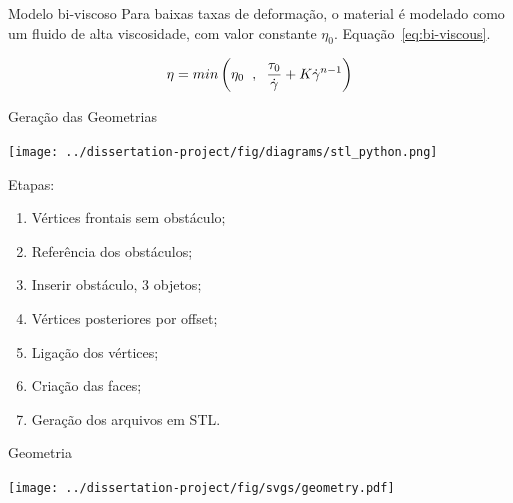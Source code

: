 \begin{frame}{Modelo bi-viscoso}
    Para baixas taxas de deformação, o material é modelado como um fluido de alta viscosidade, com valor constante $\eta_0$. Equação~\ref{eq:bi-viscous}.

    \begin{equation} \label{eq:bi-viscous}
        \eta = min \left( \eta_0 \hspace{0.2cm} , \hspace{0.2cm} \frac{\tau_0}{\dot{\gamma}} + K\dot{\gamma}^{n-1}  \right)
    \end{equation}

\end{frame}

\begin{frame}{Geração das Geometrias}
    \begin{minipage}[c]{0.55\textwidth}
        \centering
        \texttt{[image: ../dissertation-project/fig/diagrams/stl\_python.png]}
    \end{minipage}
    \hfill
    \begin{minipage}[c]{0.43\textwidth}
        Etapas:
        \vspace{.25cm}
        \begin{enumerate}
            \item Vértices frontais sem obstáculo; \pause
            \item Referência dos obstáculos; \pause
            \item Inserir obstáculo, 3 objetos; \pause
            \item Vértices posteriores por offset; \pause
            \item Ligação dos vértices; \pause
            \item Criação das faces; \pause
            \item Geração dos arquivos em STL.
        \end{enumerate}
    \end{minipage}
    \end{frame}


\begin{frame}{Geometria}
    \begin{minipage}[c]{0.58\textwidth}
        \texttt{[image: ../dissertation-project/fig/svgs/geometry.pdf]}
    \end{minipage}
    \hfill
    \begin{minipage}[c]{0.38\textwidth}
    \end{minipage}
\end{frame}


